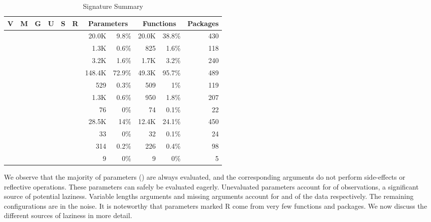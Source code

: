 \documentclass[review,creen,acmsmall]{acmart}
\newcommand{\xmark}{\textcolor{red}{\ding{55}}}
\newcommand{\cmark}{\textcolor{green}{\ding{51}}}
\begin{document}
\begin{table}[!h] \small
  \caption{Signature Summary} \label{table:strictdist} \centering
  \begin{tabular}{ccccccrrrrr}\toprule
    \bf V&\bf M&\bf G&\bf U&\bf S&\bf R&\multicolumn{2}{c}{\textbf{Parameters}} &\multicolumn{2}{c}{\textbf{Functions}}&\bf Packages\\\midrule
    \cmark{}&\xmark{}&\xmark{}&\xmark{}&\xmark{}&\xmark{}&20.0K&9.8\%&20.0K&38.8\%&430\\
    \xmark{}&\cmark{}&\xmark{}&\xmark{}&\xmark{}&\xmark{}&1.3K&0.6\%&825&1.6\%&118\\
    \xmark{}&\xmark{}&\cmark{}&\xmark{}&\xmark{}&\xmark{}&3.2K&1.6\%&1.7K&3.2\%&240\\
    \xmark{}&\xmark{}&\xmark{}&\xmark{}&\xmark{}&\xmark{}&148.4K&72.9\%&49.3K&95.7\%&489\\
    \xmark{}&\xmark{}&\xmark{}&\xmark{}&\xmark{}&\cmark{}&529&0.3\%&509&1\%&119\\
    \xmark{}&\xmark{}&\xmark{}&\xmark{}&\cmark{}&\xmark{}&1.3K&0.6\%&950&1.8\%&207\\
    \xmark{}&\xmark{}&\xmark{}&\xmark{}&\cmark{}&\cmark{}&76&0\%&74&0.1\%&22\\
    \xmark{}&\xmark{}&\xmark{}&\cmark{}&\xmark{}&\xmark{}&28.5K&14\%&12.4K&24.1\%&450\\
    \xmark{}&\xmark{}&\xmark{}&\cmark{}&\xmark{}&\cmark{}&33&0\%&32&0.1\%&24\\
    \xmark{}&\xmark{}&\xmark{}&\cmark{}&\cmark{}&\xmark{}&314&0.2\%&226&0.4\%&98\\
    \xmark{}&\xmark{}&\xmark{}&\cmark{}&\cmark{}&\cmark{}&9&0\%&9&0\%&5\\
    \bottomrule
  \end{tabular}
\end{table}

We observe that the majority of parameters (\TotalStrictParamPerc) are always
evaluated, and the corresponding arguments do not perform side-effects or
reflective operations. These parameters can safely be evaluated eagerly.
Unevaluated parameters account for \TotalUnevaluatedParamPerc of observations, a
significant source of potential laziness. Variable lengths arguments and missing
arguments account for \TotalVarargParamPerc and \TotalMissingParamPerc of the
data respectively. The remaining configurations are in the noise. It is
noteworthy that parameters marked R come from very few functions and packages.
We now discuss the different sources of laziness in more detail.
\end{document}
